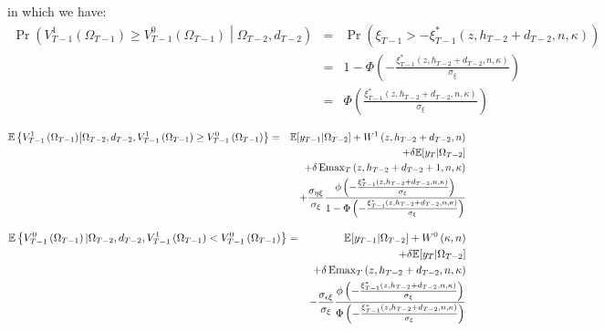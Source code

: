 \noindent in which we have:
\begin{eqnarray*}
\Pr\left(V^1_{T-1}\left(\Omega_{T-1}\right) \geq V^0_{T-1}\left(\Omega_{T-1}\right) \middle| \Omega_{T-2}, d_{T-2} \right) &=& \Pr \left(\xi_{T-1} > -\xi^*_{T-1}\left(z, h_{T-2}+d_{T-2}, n, \kappa \right) \right)\\
&=& 1 - \Phi \left(-\frac{\xi^*_{T-1}\left(z, h_{T-2}+d_{T-2}, n, \kappa \right)}{\sigma_\xi}\right) \\
&=& \Phi \left(\frac{\xi^*_{T-1}\left(z, h_{T-2}+d_{T-2}, n, \kappa \right)}{\sigma_\xi}\right)
\end{eqnarray*}

\begin{eqnarray*}
\mathbb{E} \left\{ V^{1}_{T-1}\left(\Omega_{T-1}\right) \middle| \Omega_{T-2}, d_{T-2}, V^{1}_{T-1}\left(\Omega_{T-1}\right) \geq V^{0}_{T-1}\left(\Omega_{T-1}\right) \right\} &=& \mathbb{E} [y_{T-1} | \Omega_{T-2}] + W^1 \left( z, h_{T-2}+ d_{T-2}, n \right) \\
& & + \delta \mathbb{E} [y_T | \Omega_{T-2}] \\
& & + \delta \operatorname{Emax}_T \left( z, h_{T-2} + d_{T-2} +1, n, \kappa \right) \\
& & + \frac{\sigma_{\eta \xi}}{\sigma_\xi} \frac{\phi\left(-\frac{\xi^*_{T-1}\left(z, h_{T-2}+d_{T-2}, n, \kappa \right)}{\sigma_\xi} \right)}{1-\Phi\left( -\frac{\xi^*_{T-1}\left(z, h_{T-2}+d_{T-2}, n, \kappa \right)}{\sigma_\xi}\right)}   
\end{eqnarray*}
 
\begin{eqnarray*}
\mathbb{E} \left\{ V^{0}_{T-1}\left(\Omega_{T-1}\right) | \Omega_{T-2}, d_{T-2}, V^{1}_{T-1}\left(\Omega_{T-1}\right) < V^{0}_{T-1}\left(\Omega_{T-1}\right) \right\}
&=& \mathbb{E} [y_{T-1} | \Omega_{T-2}] + W^0\left(\kappa, n \right) \\
& & +\delta \mathbb{E} [y_T | \Omega_{T-2}] \\
& & + \delta \operatorname{Emax}_T \left( z, h_{T-2}+d_{T-2}, n, \kappa \right) \\
& & - \frac{\sigma_{\epsilon \xi}}{\sigma_\xi} \frac{\phi\left(-\frac{\xi^*_{T-1}\left(z, h_{T-2}+d_{T-2},n,\kappa\right)}{\sigma_\xi}\right)}{\Phi\left(-\frac{\xi^*_{T-1}\left(z, h_{T-2}+d_{T-2}, n, \kappa \right)}{\sigma_\xi}\right)}
\end{eqnarray*} 

